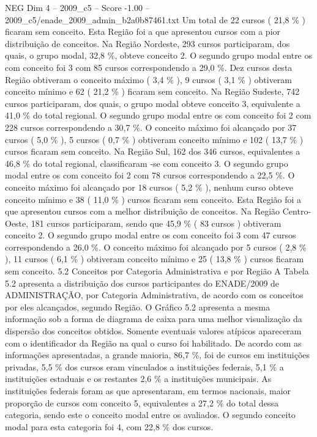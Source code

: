 \begin{textsample}{NEG Dim 4 – 2009\_c5 – Score -1.00 – 2009\_c5/enade\_2009\_admin\_b2a0b87461.txt}
Um total de 22 cursos ( 21,8 \% ) ficaram sem conceito.
Esta Região foi a que apresentou cursos com a pior distribuição de conceitos.
Na Região Nordeste, 293 cursos participaram, dos quais, o grupo modal, 32,8 \%, obteve conceito 2.
O segundo grupo modal entre os com conceito foi 3 com 85 cursos correspondendo a 29,0 \%.
Dez cursos desta Região obtiveram o conceito máximo ( 3,4 \% ), 9 cursos ( 3,1 \% ) obtiveram conceito mínimo e 62 ( 21,2 \% ) ficaram sem conceito.
Na Região Sudeste, 742 cursos participaram, dos quais, o grupo modal obteve conceito 3, equivalente a 41,0 \% do total regional.
O segundo grupo modal entre os com conceito foi 2 com 228 cursos correspondendo a 30,7 \%.
O conceito máximo foi alcançado por 37 cursos ( 5,0 \% ), 5 cursos ( 0,7 \% ) obtiveram conceito mínimo e 102 ( 13,7 \% ) cursos ficaram sem conceito.
Na Região Sul, 162 dos 346 cursos, equivalentes a 46,8 \% do total regional, classificaram -se com conceito 3.
O segundo grupo modal entre os com conceito foi 2 com 78 cursos correspondendo a 22,5 \%.
O conceito máximo foi alcançado por 18 cursos ( 5,2 \% ), nenhum curso obteve conceito mínimo e 38 ( 11,0 \% ) cursos ficaram sem conceito.
Esta Região foi a que apresentou cursos com a melhor distribuição de conceitos.
Na Região Centro-Oeste, 181 cursos participaram, sendo que 45,9 \% ( 83 cursos ) obtiveram conceito 2.
O segundo grupo modal entre os com conceito foi 3 com 47 cursos correspondendo a 26,0 \%.
O conceito máximo foi alcançado por 5 cursos ( 2,8 \% ), 11 cursos ( 6,1 \% ) obtiveram conceito mínimo e 25 ( 13,8 \% ) cursos ficaram sem conceito. 5.2 Conceitos por Categoria Administrativa e por Região A Tabela 5.2 apresenta a distribuição dos cursos participantes do ENADE/2009 de ADMINISTRAÇÃO, por Categoria Administrativa, de acordo com os conceitos por eles alcançados, segundo Região.
O Gráfico 5.2 apresenta a mesma informação sob a forma de diagrama de caixa para uma melhor visualização da dispersão dos conceitos obtidos.
Somente eventuais valores atípicos apareceram com o identificador da Região na qual o curso foi habilitado.
De acordo com as informações apresentadas, a grande maioria, 86,7 \%, foi de cursos em instituições privadas, 5,5 \% dos cursos eram vinculados a instituições federais, 5,1 \% a instituições estaduais e os restantes 2,6 \% a instituições municipais.
As instituições federais foram as que apresentaram, em termos nacionais, maior proporção de cursos com conceito 5, equivalentes a 27,2 \% do total dessa categoria, sendo este o conceito modal entre os avaliados.
O segundo conceito modal para esta categoria foi 4, com 22,8 \% dos cursos.

\end{textsample}

